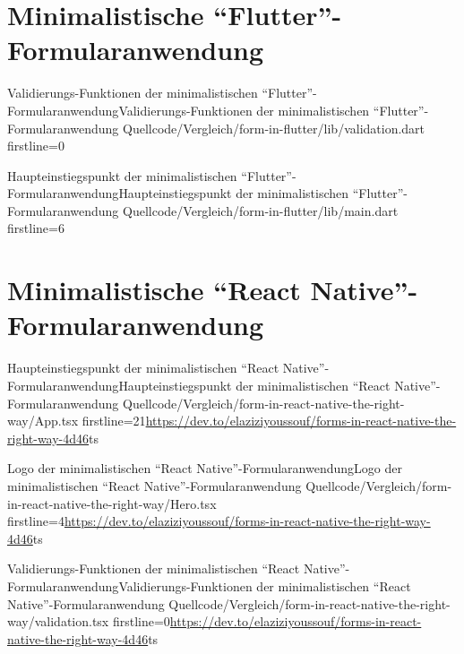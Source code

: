 

\chapter{Minimalistische \enquote{Flutter}-Formularanwendung}
\label{chap:VergleichFlutter}

\begin{alexlisting}{Validierungs-Funktionen der minimalistischen \enquote{Flutter}-Formularanwendung}{Validierungs-Funktionen der minimalistischen \enquote{Flutter}-Formularanwendung}
  {Quellcode/Vergleich/form-in-flutter/lib/validation.dart}
  {firstline=0}
  \label{lst:VergleichFlutterValidation}
\end{alexlisting}

\renewcommand{\fcolorbox}[4][]{#4}
\begin{alexlisting}{Haupteinstiegspunkt der minimalistischen \enquote{Flutter}-Formularanwendung}{Haupteinstiegspunkt der minimalistischen \enquote{Flutter}-Formularanwendung}
  {Quellcode/Vergleich/form-in-flutter/lib/main.dart}
  {firstline=6}
  \label{lst:VergleichFlutterMain}
\end{alexlisting}

\clearpage
\chapter{Minimalistische \enquote{React Native}-Formularanwendung} 
\label{chap:VergleichReactNatveApp}

\begin{fremdeslisting}{Haupteinstiegspunkt der minimalistischen \enquote{React Native}-Formularanwendung}{Haupteinstiegspunkt der minimalistischen \enquote{React Native}-Formularanwendung}
  {Quellcode/Vergleich/form-in-react-native-the-right-way/App.tsx}
  {firstline=21}{\url{https://dev.to/elaziziyoussouf/forms-in-react-native-the-right-way-4d46}}{ts}
  \label{lst:VergleichReactNatveApp}
\end{fremdeslisting}

\begin{fremdeslisting}{Logo der minimalistischen \enquote{React Native}-Formularanwendung}{Logo der minimalistischen \enquote{React Native}-Formularanwendung}
  {Quellcode/Vergleich/form-in-react-native-the-right-way/Hero.tsx}
  {firstline=4}{\url{https://dev.to/elaziziyoussouf/forms-in-react-native-the-right-way-4d46}}{ts}
  \label{lst:VergleichReactNatveHero}
\end{fremdeslisting}

\begin{fremdeslisting}{Validierungs-Funktionen der minimalistischen \enquote{React Native}-Formularanwendung}{Validierungs-Funktionen der minimalistischen \enquote{React Native}-Formularanwendung}
  {Quellcode/Vergleich/form-in-react-native-the-right-way/validation.tsx}
  {firstline=0}{\url{https://dev.to/elaziziyoussouf/forms-in-react-native-the-right-way-4d46}}{ts}
  \label{lst:VergleichReactNatveValidation}
\end{fremdeslisting}
 
